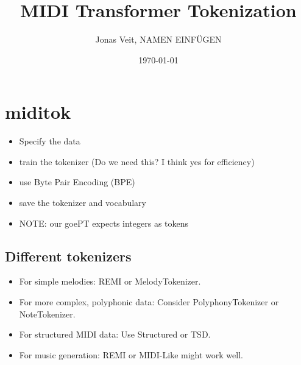\documentclass{article}
\title{MIDI Transformer Tokenization}
\author{Jonas Veit, NAMEN EINFÜGEN }
\date{\today}
\begin{document}
    \maketitle
    \section*{miditok}
    \begin{itemize}
        \item Specify the data
        \item train the tokenizer (Do we need this? I think yes for efficiency)
        \item use Byte Pair Encoding (BPE) 
        \item save the tokenizer and vocabulary
        \item NOTE: our goePT expects integers as tokens
    \end{itemize}
    
    \subsection*{Different tokenizers}
    \begin{itemize}
        \item For simple melodies: REMI or MelodyTokenizer.
        \item For more complex, polyphonic data: Consider PolyphonyTokenizer or NoteTokenizer.
        \item For structured MIDI data: Use Structured or TSD.
        \item For music generation: REMI or MIDI-Like might work well.
    \end{itemize}

    
\end{document}
